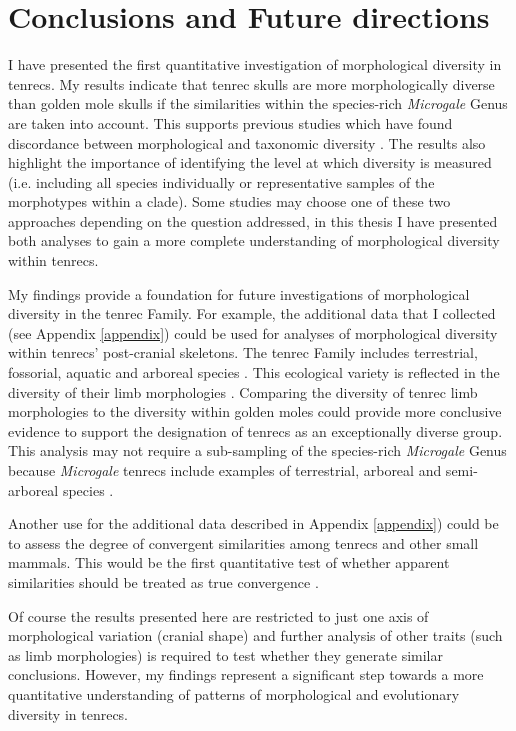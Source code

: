 \section{Conclusions and Future directions}
\label{sect:concl}

	I have presented the first quantitative investigation of morphological diversity in tenrecs. My results indicate that tenrec skulls are more morphologically diverse than golden mole skulls if the similarities within the species-rich \textit{Microgale} Genus are taken into account. This supports previous studies which have found discordance between morphological and taxonomic diversity \citep[e.g.][]{Ruta2013, Hopkins2013}. The results also highlight the importance of identifying the level at which diversity is measured (i.e. including all species individually or representative samples of the morphotypes within a clade). Some studies may choose one of these two approaches depending on the question addressed, in this thesis I have presented both analyses to gain a more complete understanding of morphological diversity within tenrecs. 
	
	My findings provide a foundation for future investigations of morphological diversity in the tenrec Family. For example, the additional data that I collected (see Appendix \ref{appendix}) could be used for analyses of morphological diversity within tenrecs' post-cranial skeletons. The tenrec Family includes terrestrial, fossorial, aquatic and arboreal species \citep{Olson2013, Soarimalala2011}. This ecological variety is reflected in the diversity of their limb morphologies \citep{Salton2009, Salton2004}. Comparing the diversity of tenrec limb morphologies to the diversity within golden moles could provide more conclusive evidence to support the designation of tenrecs as an exceptionally diverse group. This analysis may not require a sub-sampling of the species-rich \textit{Microgale} Genus because \textit{Microgale} tenrecs include examples of terrestrial, arboreal and semi-arboreal species \citep{Soarimalala2011}.	
	
	Another use for the additional data described in Appendix \ref{appendix}) could be to assess the degree of convergent similarities among tenrecs and other small mammals. This would be the first quantitative test of whether apparent similarities \citep{Olson2013, Soarimalala2011, Eisenberg1969} should be treated as true convergence \citep[e.g.][]{Losos2011, Stayton2008}.
	
	Of course the results presented here are restricted to just one axis of morphological variation (cranial shape) and further analysis of other traits (such as limb morphologies) is required to test whether they generate similar conclusions. However, my findings represent a significant step towards a more quantitative understanding of patterns of morphological and evolutionary diversity in tenrecs. 

